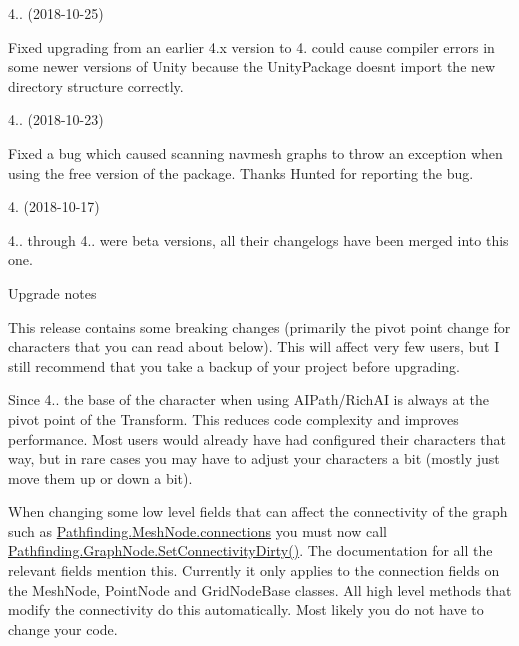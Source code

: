 \begin{DoxyItemize}
\begin{DoxyItemize}
\end{DoxyItemize}
\item 4.. (2018-\/10-\/25)
\begin{DoxyItemize}
\item Fixed upgrading from an earlier 4.\+x version to 4. could cause compiler errors in some newer versions of Unity because the Unity\+Package doesn\textquotesingle{}t import the new directory structure correctly.
\end{DoxyItemize}
\item 4.. (2018-\/10-\/23)
\begin{DoxyItemize}
\item Fixed a bug which caused scanning navmesh graphs to throw an exception when using the free version of the package. Thanks Hunted for reporting the bug.
\end{DoxyItemize}
\item 4. (2018-\/10-\/17)
\begin{DoxyItemize}
\item 4.. through 4.. were beta versions, all their changelogs have been merged into this one.
\item Upgrade notes
\begin{DoxyItemize}
\item This release contains some breaking changes (primarily the pivot point change for characters that you can read about below). This will affect very few users, but I still recommend that you take a backup of your project before upgrading.
\item Since 4.. the base of the character when using A\+I\+Path/\+Rich\+AI is always at the pivot point of the Transform. This reduces code complexity and improves performance. Most users would already have had configured their characters that way, but in rare cases you may have to adjust your characters a bit (mostly just move them up or down a bit).
\item When changing some low level fields that can affect the connectivity of the graph such as \mbox{\hyperlink{class_pathfinding_1_1_mesh_node_ae2ff2da1b57b05418933fec03ceb68a0}{Pathfinding.\+Mesh\+Node.\+connections}} you must now call \mbox{\hyperlink{class_pathfinding_1_1_graph_node_a0b21806526399565ea57fc4e8e4949b9}{Pathfinding.\+Graph\+Node.\+Set\+Connectivity\+Dirty()}}. The documentation for all the relevant fields mention this. Currently it only applies to the connection fields on the Mesh\+Node, Point\+Node and Grid\+Node\+Base classes. All high level methods that modify the connectivity do this automatically. Most likely you do not have to change your code.

\end{DoxyItemize}
\end{DoxyItemize}
\end{DoxyItemize}
